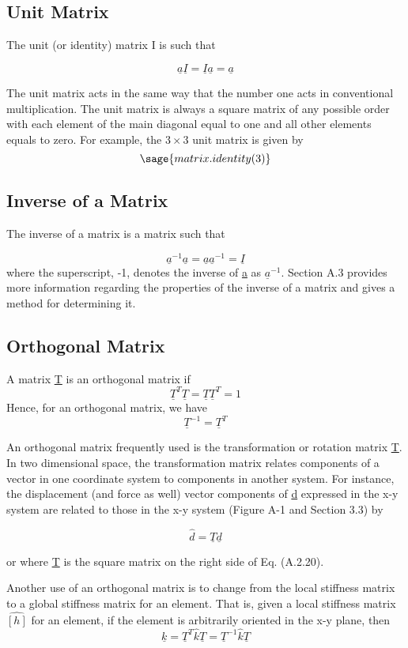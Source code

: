 \documentclass[12pt]{report}
\begin{document}
\subsection{Unit Matrix}
The unit (or identity) matrix I is such that

$$\underline{a}\underline{I}=\underline{I}\underline{a}=\underline{a}$$

The unit matrix acts in the same way that the number one acts in
conventional multiplication. The unit matrix is always a square matrix
of any possible order with each element of the main diagonal equal to
one and all other elements equals to zero. For example, the $3 \times 3$
unit matrix is given by
$$\sage{matrix.identity(3)}$$

\subsection{Inverse of a Matrix}

The inverse of a matrix is a matrix such that

$$\underline{a}^{-1}\underline{a}=\underline{a}\underline{a}^{-1}=\underline{I}$$
where the superscript, -1, denotes the inverse of \underline{a} as $\underline{a}^{-1}$.
Section A.3 provides more information regarding the properties of the
inverse of a matrix and gives a method for determining it.

\subsection{Orthogonal Matrix}
A matrix \underline{T} is an orthogonal matrix if
$$\underline{T}^T\underline{T} = \underline{T}\underline{T}^T=1$$
Hence, for an orthogonal matrix, we have
$$\underline{T}^{-1}=\underline{T}^T$$

An orthogonal matrix frequently used is the transformation or rotation
matrix \underline{T}. In two dimensional space, the transformation matrix
relates components of a vector in one coordinate system to components
in another system. For instance, the displacement (and force as well)
vector components of \underline{d} expressed in the x-y system are related to
those in the x-y system (Figure A-1 and Section 3.3) by

$$\hat{d}=\underline{T}\underline{d}$$


or
where \underline{T} is the square matrix on the right side of Eq. (A.2.20).


Another use of an orthogonal matrix is to change from the local
stiffness matrix to a global stiffness matrix for an element. That is,
given a local stiffness matrix $\hat{[h]}$ for an element, if the
element is arbitrarily oriented in the x-y plane, then
$$\underline{k}=\underline{T}^T \hat{k}\underline{T}=\underline{T}^{-1}\hat{k}\underline{T}$$
\end{document}
